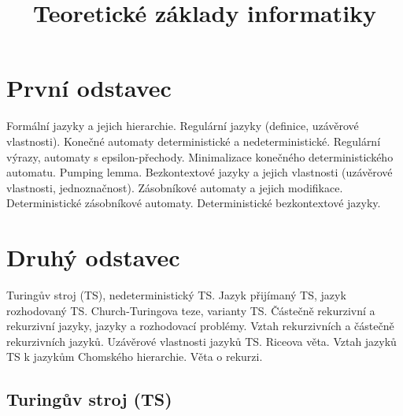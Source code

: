 \documentclass[10pt,a4paper]{article}
\title{Teoretické základy informatiky}
\begin{document}
\maketitle



\newpage

\section{První odstavec}

Formální jazyky a jejich hierarchie. Regulární jazyky (definice, uzávěrové vlastnosti). Konečné automaty deterministické
a nedeterministické. Regulární výrazy, automaty s epsilon-přechody. Minimalizace konečného deterministického
automatu. Pumping lemma. Bezkontextové jazyky a jejich vlastnosti (uzávěrové vlastnosti, jednoznačnost).
Zásobníkové automaty a jejich modifikace. Deterministické zásobníkové automaty. Deterministické
bezkontextové jazyky.


\section{Druhý odstavec}

Turingův stroj (TS), nedeterministický TS. Jazyk přijímaný TS, jazyk rozhodovaný TS. Church-Turingova
teze, varianty TS. Částečně rekurzivní a rekurzivní jazyky, jazyky a rozhodovací problémy. Vztah rekurzivních
a částečně rekurzivních jazyků. Uzávěrové vlastnosti jazyků TS. Riceova věta. Vztah jazyků TS k jazykům
Chomského hierarchie. Věta o rekurzi.

	\subsection{Turingův stroj (TS)}
\end{document}

